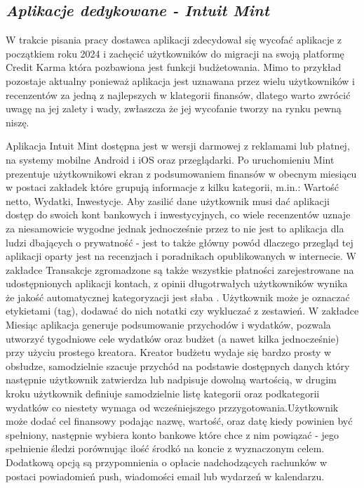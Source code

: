\documentclass[a4paper,10pt, twoside]{report}
\newcommand{\customstylesection}[1]{\textbf{\textit{#1}}}
\begin{document}
\begin{large}
\section{\customstylesection{Aplikacje dedykowane - Intuit Mint}}
{W trakcie pisania pracy dostawca aplikacji zdecydował się wycofać aplikacje z 
początkiem roku 2024 i zachęcić użytkowników do migracji na swoją platformę 
Credit Karma \cite{mintwycofanie} która pozbawiona jest funkcji budżetowania. 
Mimo to przykład pozostaje aktualny ponieważ aplikacja jest uznawana przez wielu
 użytkowników i recenzentów za jedną z najlepszych w klategorii finansów, 
dlatego warto zwrócić uwagę na jej zalety i wady, zwłaszcza że jej wycofanie 
tworzy na rynku pewną niszę.}


{Aplikacja Intuit Mint \cite{mint}\cite{mintrecenzja} dostępna jest w wersji 
darmowej z reklamami lub płatnej, na systemy mobilne Android i iOS oraz 
przeglądarki. Po uruchomieniu Mint prezentuje użytkownikowi ekran z 
podsumowaniem finansów w obecnym miesiącu w postaci zakładek które grupują 
informacje z kilku kategorii, m.in.: Wartość netto, Wydatki, Inwestycje. Aby 
zasilić dane użytkownik musi dać aplikacji dostęp do swoich kont bankowych i 
inwestycyjnych, co wiele recenzentów uznaje za niesamowicie wygodne jednak 
jednocześnie przez to nie jest to aplikacja dla ludzi dbających o prywatność - 
jest to także główny powód dlaczego przegląd tej aplikacji oparty jest na 
recenzjach i poradnikach opublikowanych w internecie. W zakładce Transakcje 
zgromadzone są także wszystkie płatności zarejestrowane na udostępnionych 
aplikacji kontach, z opinii długotrwałych użytkowników wynika że jakość 
automatycznej kategoryzacji jest 
słaba \cite{porownanieaplikacji1}\cite{porownanieaplikacji2}
\cite{porownanieaplikacji3}\cite{porownanieaplikacji4}. Użytkownik może je 
oznaczać etykietami (tag), dodawać do nich notatki czy wykluczać z zestawień. W 
zakładce Miesiąc aplikacja generuje podsumowanie przychodów i wydatków, pozwala 
utworzyć tygodniowe cele wydatków oraz budżet (a nawet kilka jednocześnie) przy 
użyciu prostego kreatora. Kreator budżetu wydaje się bardzo prosty w obsłudze, 
samodzielnie szacuje przychód na podstawie dostępnych danych który następnie 
użytkownik zatwierdza lub nadpisuje dowolną wartością, w drugim kroku użytkownik
 definiuje samodzielnie listę kategorii oraz podkategorii wydatków co niestety 
wymaga od wcześniejszego przzygotowania.Użytkownik może dodać cel finansowy 
podając nazwę, wartość, oraz datę kiedy powinien być spełniony, następnie 
wybiera konto bankowe które chce z nim powiązać - jego spełnienie śledzi 
porównując ilość środkó na koncie z wyznaczonym celem. Dodatkową opcją są 
przypomnienia o opłacie nadchodzących rachunków w postaci powiadomień push, 
wiadomości email lub wydarzeń w kalendarzu.}


\end{large}
\end{document}
